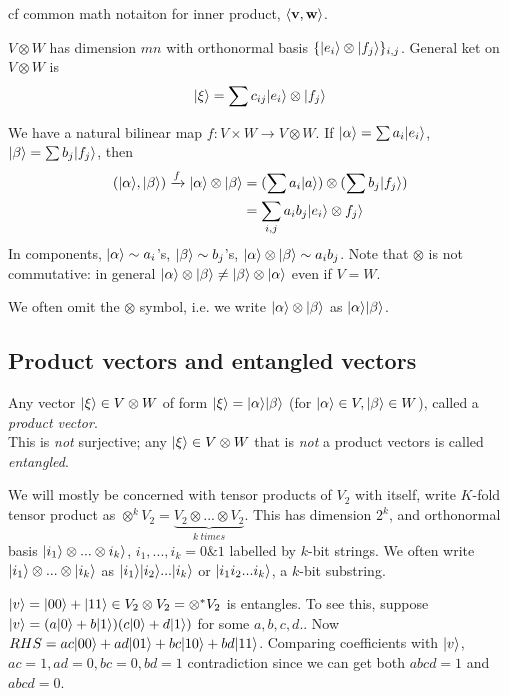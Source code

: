 \documentclass[a4paper]{article}
\begin{document}
cf common math notaiton for inner product, $\langle \mathbf{v},\mathbf{w}\rangle$.

$V \otimes W$ has dimension $mn$ with orthonormal basis $\{|e_i \rangle \otimes |f_j \rangle \}_{i,j}$. General ket on $V \otimes W$ is $$|\xi \rangle = \sum c_{ij} |e_i \rangle \otimes | f_j \rangle$$

We have a natural bilinear map $f:V \times W \to V \otimes W$. If $|\alpha \rangle = \sum a_i | e_i \rangle$, $|\beta \rangle = \sum b_j |f_j \rangle$, then 
\begin{equation*}
\begin{aligned}
(|\alpha\rangle, |\beta\rangle) \xrightarrow{f} |\alpha \rangle \otimes |\beta\rangle &= (\sum a_i | a\rangle ) \otimes (\sum b_j | f_j \rangle )\\
&= \sum_{i,j} a_i b_j | e_i \rangle \otimes f_j\rangle
\end{aligned}
\end{equation*}
In components, $|\alpha\rangle \sim a_i$'s, $|\beta \rangle \sim b_j$'s, $|\alpha\rangle \otimes |\beta \rangle \sim a_ib_j$. Note that $\otimes$ is not commutative: in general $|\alpha\rangle \otimes |\beta \rangle \neq |\beta\rangle \otimes |\alpha\rangle$ even if $V=W$.

We often omit the $\otimes$ symbol, i.e. we write $|\alpha\rangle \otimes |\beta \rangle$ as $|\alpha\rangle |\beta\rangle$.

\subsection{Product vectors and entangled vectors}
Any vector $|\xi\rangle \in V \otimes W$ of form $|\xi\rangle = |\alpha\rangle |\beta\rangle$ (for $|\alpha\rangle \in V, |\beta\rangle \in W$), called a \emph{product vector}.\\
This is \emph{not} surjective; any $|\xi\rangle \in V \otimes W$ that is \emph{not} a product vectors is called \emph{entangled}.

We will mostly be concerned with tensor products of $V_2$ with itself, write $K$-fold tensor product as $\otimes^k V_2 = \underbrace{V_2 \otimes ... \otimes V_2}_{k \ times}$. This has dimension $2^k$, and orthonormal basis $|i_1 \rangle \otimes ... \otimes i_k\rangle$, $i_1,...,i_k = 0 \& 1$ labelled by $k$-bit strings. We often write $|i_1 \rangle \otimes ... \otimes |i_k\rangle$ as $|i_1 \rangle |i_2 \rangle ... |i_k \rangle$ or $|i_1i_2...i_k\rangle$, a $k$-bit substring.

\begin{eg}
$|v\rangle = |00\rangle + |11\rangle \in V_2 \otimes V_2 = \otimes^* V_2$ is entangles. To see this, suppose $|v\rangle = (a|0\rangle + b|1\rangle) (c|0\rangle + d|1\rangle)$ for some $a,b,c,d.$. Now $RHS = ac|00\rangle+ad|01\rangle+bc|10\rangle+bd|11\rangle$. Comparing coefficients with $|v\rangle$, $ac=1,ad=0,bc=0,bd=1$ contradiction since we can get both $abcd=1$ and $abcd = 0$.
\end{eg}
\end{document}

